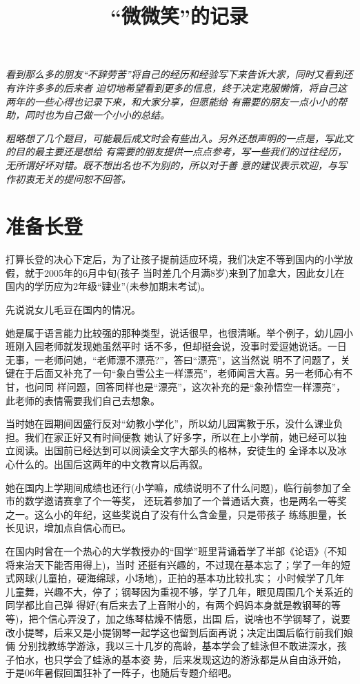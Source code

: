 \documentclass[11pt,a4paper,onecolumn]{article}
\title{``微微笑''的记录}
\author{}
\date{}
\begin{document}
\pagestyle{fancy}

\textit{看到那么多的朋友``不辞劳苦''将自己的经历和经验写下来告诉大家，同时又看到还有许许多多的后来者
  迫切地希望看到更多的信息，终于决定克服懒惰，将自己这两年的一些心得也记录下来，和大家分享，但愿能给
  有需要的朋友一点小小的帮助，同时也为自己做一个小小的总结。}

\textit{粗略想了几个题目，可能最后成文时会有些出入。另外还想声明的一点是，写此文的目的最主要还是想给
  有需要的朋友提供一点点参考，写一些我们的过往经历，无所谓好坏对错。既不想出名也不为别的，所以对于善
  意的建议表示欢迎，与写作初衷无关的提问恕不回答。}

\section{准备长登}

打算长登的决心下定后，为了让孩子提前适应环境，我们决定不等到国内的小学放假，就于2005年的6月中旬(孩子
当时差几个月满8岁)来到了加拿大，因此女儿在国内的学历应为2年级``肄业''(未参加期末考试)。

先说说女儿毛豆在国内的情况。

她是属于语言能力比较强的那种类型，说话很早，也很清晰。举个例子，幼儿园小班刚入园老师就发现她虽然平时
话不多，但却挺会说，没事时爱逗她说话。一日无事，一老师问她，``老师漂不漂亮?''，答曰``漂亮''，这当然说
明不了问题了，关键在于后面又补充了一句``象白雪公主一样漂亮''，老师闻言大喜。另一老师心有不甘，也问同
样问题，回答同样也是``漂亮''，这次补充的是``象孙悟空一样漂亮''，此老师的表情需要我们自己去想象。

当时她在园期间因盛行反对``幼教小学化''，所以幼儿园寓教于乐，没什么课业负担。我们在家正好又有时间便教
她认了好多字，所以在上小学前，她已经可以独立阅读。出国前已经达到可以阅读全文字大部头的格林，安徒生的
全译本以及冰心什么的。出国后这两年的中文教育以后再叙。

她在国内上学期间成绩也还行(小学嘛，成绩说明不了什么问题)，临行前参加了全市的数学邀请赛拿了个一等奖，
还玩着参加了一个普通话大赛，也是两名一等奖之一。这么小的年纪，这些奖说白了没有什么含金量，只是带孩子
练练胆量，长长见识，增加点自信心而已。

在国内时曾在一个热心的大学教授办的``国学''班里背诵着学了半部《论语》(不知将来治天下能否用得上)，当时
还挺有兴趣的，不过现在基本忘了；学了一年的短式网球(儿童拍，硬海绵球，小场地)，正拍的基本功比较扎实；
小时候学了几年儿童舞，兴趣不大，停了；钢琴因为重视不够，学了几年，眼见周围几个关系近的同学都比自己弹
得好(有后来去了上音附小的，有两个妈妈本身就是教钢琴的等等)，把个信心弄没了，加之练琴枯燥不情愿，出国
后，说啥也不学钢琴了，说要改小提琴，后来又是小提钢琴一起学这也留到后面再说；决定出国后临行前我们娘倆
分别找教练学游泳，我以三十几岁的高龄，基本学会了蛙泳但不敢进深水，孩子怕水，也只学会了蛙泳的基本姿
势，后来发现这边的游泳都是从自由泳开始，于是06年暑假回国狂补了一阵子，也随后专题介绍吧。
\end{document}
